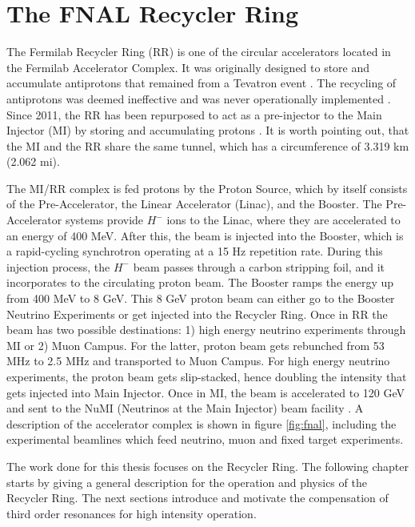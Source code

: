 \chapter{The FNAL Recycler Ring}
\label{sec:ch3}

The Fermilab Recycler Ring (RR) is one of the circular accelerators located in the Fermilab Accelerator Complex. It was originally designed to store and accumulate antiprotons that remained from a Tevatron event \cite{rr0}. The recycling of antiprotons was deemed ineffective and was never operationally implemented \cite{rrnagaitsev}. Since 2011, the RR has been repurposed to act as a pre-injector to the Main Injector (MI) by storing and accumulating protons \cite{rr1}. It is worth pointing out, that the MI and the RR share the same tunnel, which has a circumference of 3.319 km (2.062 mi).

The MI/RR complex is fed protons by the Proton Source, which by itself consists of the Pre-Accelerator, the Linear Accelerator (Linac), and the Booster. The Pre-Accelerator systems provide $H^-$ ions to the Linac, where they are accelerated to an energy of 400 MeV. After this, the beam is injected into the Booster, which is a rapid-cycling synchrotron operating at a 15 Hz repetition rate. During this injection process, the $H^-$ beam passes through a carbon stripping foil, and it incorporates to the circulating proton beam. The Booster ramps the energy up from 400 MeV to 8 GeV. This 8 GeV proton beam can either go to the Booster Neutrino Experiments or get injected into the Recycler Ring. Once in RR the beam has two possible destinations: 1) high energy neutrino experiments through MI or 2) Muon Campus. For the latter, proton beam gets rebunched from 53 MHz to 2.5 MHz and transported to Muon Campus. For high energy neutrino experiments, the proton beam gets slip-stacked, hence doubling the intensity that gets injected into Main Injector. Once in MI, the beam is accelerated to 120 GeV and sent to the NuMI (Neutrinos at the Main Injector) beam facility \cite{rr1, rrnagaitsev, numi1}. A description of the accelerator complex is shown in figure \ref{fig:fnal}, including the experimental beamlines which feed neutrino, muon and fixed target experiments.

The work done for this thesis focuses on the Recycler Ring. The following chapter starts by giving a general description for the operation and physics of the Recycler Ring. The next sections introduce and motivate the compensation of third order resonances for high intensity operation.     

